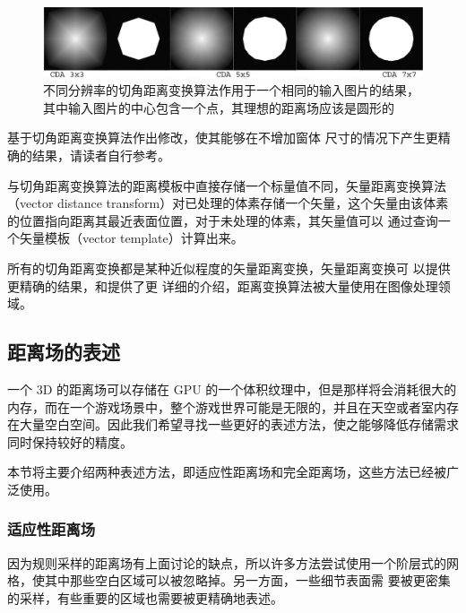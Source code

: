 \begin{figure}
\begin{fullwidth}
	\includegraphics[width=\thewidth]{figures/df/multi-distance-transform}
	\caption{不同分辨率的切角距离变换算法作用于一个相同的输入图片的结果，其中输入图片的中心包含一个点，其理想的距离场应该是圆形的}
	\label{f:df-multi-distance-transform}
\end{fullwidth}
\end{figure}

\cite{a:dead-reckoning}基于切角距离变换算法作出修改，使其能够在不增加窗体 尺寸的情况下产生更精确的结果，请读者自行参考。

与切角距离变换算法的距离模板中直接存储一个标量值不同，矢量距离变换算法（vector distance transform）对已处理的体素存储一个矢量，这个矢量由该体素的位置指向距离其最近表面位置，对于未处理的体素，其矢量值可以 通过查询一个矢量模板（vector template）计算出来。

所有的切角距离变换都是某种近似程度的矢量距离变换，矢量距离变换可 以提供更精确的结果，\cite{a:Euclidean-Distance-Mapping}和\cite{a:Vector-City-VDT}提供了更 详细的介绍，距离变换算法被大量使用在图像处理领域。



\subsection{距离场的表述}
一个 3D 的距离场可以存储在 GPU 的一个体积纹理中，但是那样将会消耗很大的内存，而在一个游戏场景中，整个游戏世界可能是无限的，并且在天空或者室内存在大量空白空间。因此我们希望寻找一些更好的表述方法，使之能够降低存储需求同时保持较好的精度。

本节将主要介绍两种表述方法，即适应性距离场和完全距离场，这些方法已经被广泛使用。



\subsubsection{适应性距离场}
因为规则采样的距离场有上面讨论的缺点，所以许多方法尝试使用一个阶层式的网格，使其中那些空白区域可以被忽略掉。另一方面，一些细节表面需 要被更密集的采样，有些重要的区域也需要被更精确地表述。

